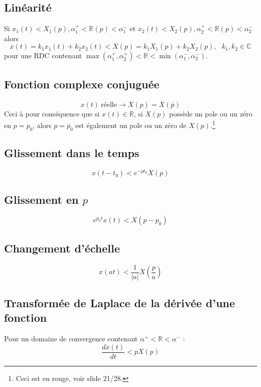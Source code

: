 	\subsection{Linéarité}
	Si $x_1(t) \lt X_1(p), \alpha_1^+ < \mathbb{R}(p) < \alpha_1^-$ et $x_2(t) \lt X_2(p),
	\alpha_2^+ < \mathbb{R}(p) < \alpha_2^-$ alors 
	\begin{equation}
	x(t) = k_1x_1(t) + k_2x_2(t) \lt X(p) = k_1X_1(p) + k_2X_2(p),\ \ \ k_1,k_2\in\mathbb{C}
	\end{equation}
	pour une RDC contenant $\max(\alpha_1^+,\alpha_2^+)< \mathbb{R} < \min(\alpha^-_1,\alpha^-_2)$.
	
	
	\subsection{Fonction complexe conjuguée}
	\begin{equation}
	x(t)\ \text{réelle} \rightarrow X(p) = \overline{X}(\overline{p})
	\end{equation}
	Ceci à pour conséquence que si $x(t) \in \mathbb{R}$, si $X(p)$ possède un pole ou un 
	zéro en $p=p_0$, alors $p=\overline{p_0}$ est également un pole ou un zéro de $X(p)$.\footnote{
	Ceci est en rouge, voir slide 21/28.}
	
	
	\subsection{Glissement dans le temps}	
	\begin{equation}
	x(t-t_0) \lt e^{-pt_0}X(p)
	\end{equation}
	
	
	\subsection{Glissement en $p$}
	\begin{equation}
	e^{p_0t}x(t) \lt X(p-p_0)
	\end{equation}
	
	
	
	\subsection{Changement d'échelle}
	\begin{equation}
	x(at) \lt \frac{1}{|a|}X\left(\frac{p}{a}\right)
	\end{equation}
	
	
	\subsection{Transformée de Laplace de la dérivée d'une fonction}
	Pour un domaine de convergence contenant $\alpha^+<\mathbb{R}<\alpha^-$ :
	\begin{equation}
	\frac{dx(t)}{dt} \lt pX(p)
	\end{equation}
	
